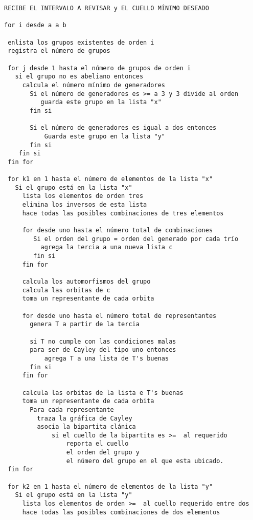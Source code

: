 \documentclass[11pt]{book}
\theoremstyle{definition}
\begin{document}
\begin{small}
\begin{verbatim}
RECIBE EL INTERVALO A REVISAR y EL CUELLO MÍNIMO DESEADO
 
for i desde a a b

 enlista los grupos existentes de orden i
 registra el número de grupos
     
 for j desde 1 hasta el número de grupos de orden i
   si el grupo no es abeliano entonces
     calcula el número mínimo de generadores             
       Si el número de generadores es >= a 3 y 3 divide al orden     
          guarda este grupo en la lista "x"
       fin si  
 
       Si el número de generadores es igual a dos entonces 
           Guarda este grupo en la lista "y"
       fin si  
    fin si            
 fin for   
    
 for k1 en 1 hasta el número de elementos de la lista "x"
   Si el grupo está en la lista "x"
     lista los elementos de orden tres
     elimina los inversos de esta lista 
     hace todas las posibles combinaciones de tres elementos     
  
     for desde uno hasta el número total de combinaciones
        Si el orden del grupo = orden del generado por cada trío     
          agrega la tercia a una nueva lista c
        fin si
     fin for    
                                 
     calcula los automorfismos del grupo
     calcula las orbitas de c 
     toma un representante de cada orbita

     for desde uno hasta el número total de representantes
       genera T a partir de la tercia

       si T no cumple con las condiciones malas 
       para ser de Cayley del tipo uno entonces
           agrega T a una lista de T's buenas
       fin si 
     fin for 

     calcula las orbitas de la lista e T's buenas
     toma un representante de cada orbita  
       Para cada representante 
         traza la gráfica de Cayley
         asocia la bipartita clánica              
             si el cuello de la bipartita es >=  al requerido
                 reporta el cuello 
                 el orden del grupo y 
                 el número del grupo en el que esta ubicado.       
 fin for

 for k2 en 1 hasta el número de elementos de la lista "y"
   Si el grupo está en la lista "y"
     lista los elementos de orden >=  al cuello requerido entre dos
     hace todas las posibles combinaciones de dos elementos      
                 

\end{verbatim}
\end{small}
\end{document}
